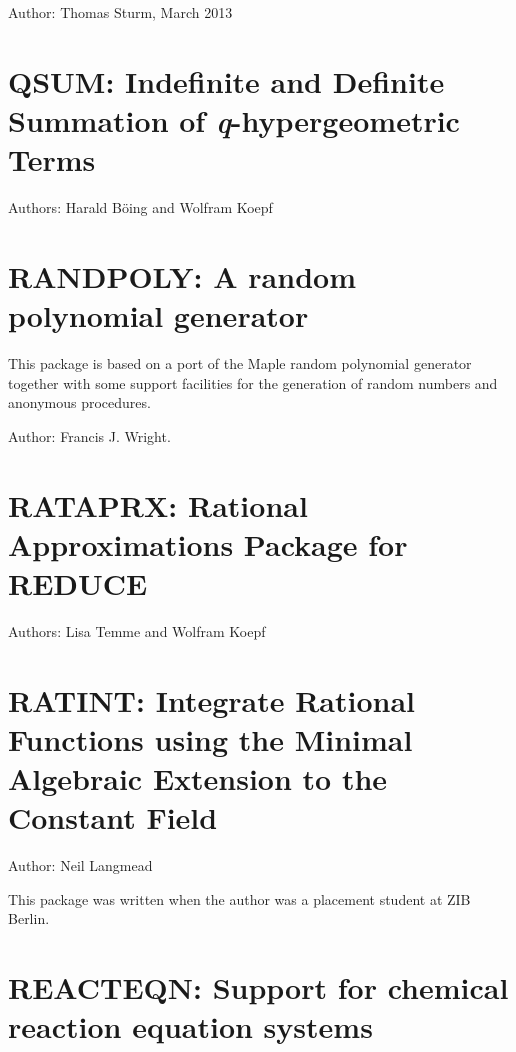 Author: Thomas Sturm, March 2013

\newpage


\section{QSUM: Indefinite and Definite Summation
of \textsl{q}-hypergeometric Terms}

Authors: Harald B\"{o}ing and Wolfram Koepf


\newpage

\section{RANDPOLY: A random polynomial generator} 

This package is based on a port of the Maple random polynomial
generator together with some support facilities for the generation
of random numbers and anonymous procedures.

Author: Francis J. Wright.


\newpage

\section{RATAPRX: Rational Approximations Package for REDUCE}

Authors: Lisa Temme and Wolfram Koepf


\newpage

\section{RATINT: Integrate Rational Functions using the Minimal Algebraic                                                                                                                           Extension to the Constant Field}

Author: Neil Langmead

This package was written when the author was a placement student at ZIB Berlin.



\section{REACTEQN: Support for chemical reaction equation systems}

